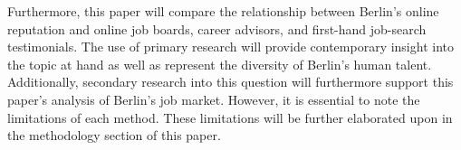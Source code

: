 Furthermore, this paper will compare the relationship between Berlin’s online reputation and online job boards, career advisors, and first-hand job-search testimonials. The use of primary research will provide contemporary insight into the topic at hand as well as represent the diversity of Berlin’s human talent. Additionally, secondary research into this question will furthermore support this paper’s analysis of Berlin’s job market. However, it is essential to note the limitations of each method. These limitations will be further elaborated upon in the methodology section of this paper.

\titlespacing*{\chapter}{0pt}{12pt}{0pt}